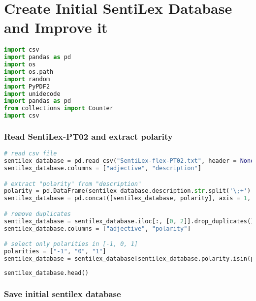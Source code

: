 
\label{ape:sentilex_database}
\hypertarget{create-initial-sentilex-database-and-improve-it}{%
\section{Create Initial SentiLex Database and Improve
it}\label{create-initial-sentilex-database-and-improve-it}}

\begin{lstlisting}[language=Python]
import csv
import pandas as pd
import os
import os.path
import random
import PyPDF2
import unidecode
import pandas as pd
from collections import Counter
import csv
\end{lstlisting}

\hypertarget{read-sentilex-pt02-and-extract-polarity}{%
\subsubsection{Read SentiLex-PT02 and extract
polarity}\label{read-sentilex-pt02-and-extract-polarity}}

\begin{lstlisting}[language=Python]
# read csv file
sentilex_database = pd.read_csv("SentiLex-flex-PT02.txt", header = None)
sentilex_database.columns = ["adjective", "description"]

# extract "polarity" from "description"
polarity = pd.DataFrame(sentilex_database.description.str.split('\;+').str[3].str.split('\=+').str[1])
sentilex_database = pd.concat([sentilex_database, polarity], axis = 1, join = 'outer')

# remove duplicates
sentilex_database = sentilex_database.iloc[:, [0, 2]].drop_duplicates()
sentilex_database.columns = ["adjective", "polarity"]

# select only polarities in [-1, 0, 1]
polarities = ["-1", "0", "1"]
sentilex_database = sentilex_database[sentilex_database.polarity.isin(polarities)]
\end{lstlisting}

\begin{lstlisting}[language=Python]
sentilex_database.head()
\end{lstlisting}

\hypertarget{save-initial-sentilex-database}{%
\subsubsection{Save initial sentilex
database}\label{save-initial-sentilex-database}}

